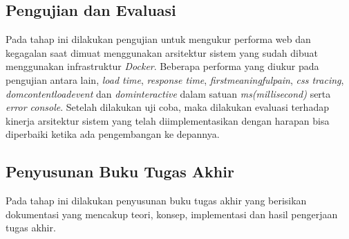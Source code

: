 		\subsection{Pengujian dan Evaluasi}
			Pada tahap ini dilakukan pengujian untuk mengukur performa web dan kegagalan saat dimuat menggunakan arsitektur sistem yang sudah dibuat menggunakan infrastruktur \textit{Docker}. Beberapa performa yang diukur pada pengujian antara lain, \textit{load time}, \textit{response time}, \textit{firstmeaningfulpain}, \textit{css tracing}, \textit{domcontentloadevent} dan \textit{dominteractive} dalam satuan \textit{ms(millisecond)} serta \textit{error console}. Setelah dilakukan uji coba, maka dilakukan evaluasi terhadap kinerja arsitektur sistem yang telah diimplementasikan dengan harapan bisa diperbaiki ketika ada pengembangan ke depannya.
		\subsection{Penyusunan Buku Tugas Akhir}
			Pada tahap ini dilakukan penyusunan buku tugas akhir yang berisikan dokumentasi yang mencakup teori, konsep, implementasi dan hasil pengerjaan tugas akhir.
	
